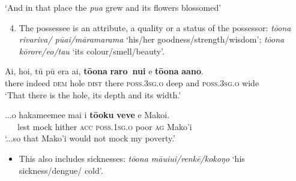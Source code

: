 \glt
‘And in that place the \textit{pua} grew and its flowers blossomed’ \textstyleExampleref{[R532-07.081]}
\z

\begin{enumerate}
\setcounter{enumi}{3} 
\item 
The possessee is an attribute, a quality or a status of the possessor: \textit{tō{\ꞌ}ona rivariva/ pūai/māramarama} ‘his/her goodness/\textit{}strength/\textit{}wisdom’; \textit{tō{\ꞌ}ona kōrore/{\ꞌ}eo/tau} ‘its colour/smell/beauty’.

\end{enumerate}

\ea\label{ex:6.82}
\gll {\ꞌ}Ai, ho{\ꞌ}i, tū pū era {\ꞌ}ai, \textbf{tō{\ꞌ}ona} \textbf{raro~nui} {\ꞌ}e \textbf{tō{\ꞌ}ona} \textbf{{\ꞌ}a{\ꞌ}ano}. \\
there indeed \textsc{dem} hole \textsc{dist} there \textsc{poss.3sg.o} deep and \textsc{poss.3sg.o} wide \\

\glt 
‘That there is the hole, its depth and its width.’ \textstyleExampleref{[R620.095]} 
\z

\ea\label{ex:6.83}
\gll ...{\ꞌ}o hakame{\ꞌ}eme{\ꞌ}e mai i \textbf{tō{\ꞌ}oku} \textbf{veve} e Mako{\ꞌ}i. \\
~~~lest mock hither \textsc{acc} \textsc{poss.1sg.o} poor \textsc{ag} Mako’i \\

\glt
‘...so that Mako’i would not mock my poverty.’ \textstyleExampleref{[R214.050]} 
\z

\begin{itemize}
\item[]
This also includes sicknesses: \textit{tō{\ꞌ}ona māuiui/renkē/kokoŋo} ‘his sickness/\textit{}dengue/ cold’.
\end{itemize}

